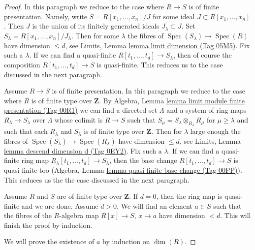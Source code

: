 \documentclass{amsart}
\theoremstyle{plain}
\theoremstyle{definition}
\theoremstyle{remark}
\numberwithin{equation}{subsection}
\def\Spec{\mathop{\mathrm{Spec}}}
\begin{document}
\begin{proof}
In this paragraph we reduce to the case where $R \to S$ is of finite
presentation. Namely, write $S = R[x_1, \ldots, x_n]/J$ for some ideal
$J \subset R[x_1, \ldots, x_n]$.
Then $J$ is the union of its finitely generated ideals $J_\lambda \subset J$.
Set $S_\lambda = R[x_1, \ldots, x_n]/J_\lambda$.
Then for some $\lambda$ the fibres of
$\Spec(S_\lambda) \to \Spec(R)$
have dimension $\leq d$, see Limits, Lemma \href{https://stacks.math.columbia.edu/tag/05M5}{lemma limit dimension (Tag 05M5)}.
Fix such a $\lambda$. If we can find a quasi-finite
$R[t_1, \ldots, t_d] \to S_\lambda$, then of course the composition
$R[t_1, \ldots, t_d] \to S$ is quasi-finite.
This reduces us to the case discussed in the next paragraph.

\medskip\noindent
Assume $R \to S$ is of finite presentation. In this paragraph we reduce
to the case where $R$ is of finite type over $\mathbf{Z}$. By
Algebra, Lemma \href{https://stacks.math.columbia.edu/tag/00R1}{lemma limit module finite presentation (Tag 00R1)}
we can find a directed set $\Lambda$ and a system of ring maps
$R_\lambda \to S_\lambda$ over $\Lambda$ whose colimit is
$R \to S$ such that $S_\mu = S_\lambda \otimes_{R_\lambda} R_\mu$
for $\mu \geq \lambda$ and
such that each $R_\lambda$ and $S_\lambda$ is of finite
type over $\mathbf{Z}$.
Then for $\lambda$ large enough the fibres of
$\Spec(S_\lambda) \to \Spec(R_\lambda)$
have dimension $\leq d$, see
Limits, Lemma \href{https://stacks.math.columbia.edu/tag/0EY2}{lemma descend dimension d (Tag 0EY2)}.
Fix such a $\lambda$. If we can find a quasi-finite ring map
$R_\lambda[t_1, \ldots, t_d] \to S_\lambda$, then the base change
$R[t_1, \ldots, t_d] \to S$ is quasi-finite too
(Algebra, Lemma \href{https://stacks.math.columbia.edu/tag/00PP}{lemma quasi finite base change (Tag 00PP)}).
This reduces us the the case discussed in the next paragraph.

\medskip\noindent
Assume $R$ and $S$ are of finite type over $\mathbf{Z}$. If $d = 0$, then
the ring map is quasi-finite and we are done. Assume $d > 0$.
We will find an element $a \in S$ such that
the fibres of the $R$-algebra map $R[x] \to S$, $x \mapsto a$
have dimension $< d$. This will finish the proof by induction.

\medskip\noindent
We will prove the existence of $a$ by induction on $\dim(R)$.


\end{proof}
\end{document}
